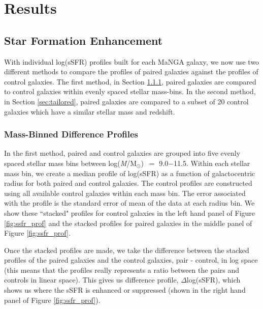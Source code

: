 \documentclass[iop,revtex4,twocolumn,apj,numberedappendix,appendixfloats]{emulateapj}
\newcommand{\logm}{log({\it M}/M$_{\odot}$)}
\begin{document}
\section{Results}\label{sec:results}

\subsection{Star Formation Enhancement}

With individual log(sSFR) profiles built for each MaNGA galaxy, we now use two different methods to compare the profiles of paired galaxies against the profiles of control galaxies. The first method, in Section \ref{sec:mass-bin}, paired galaxies are compared to control galaxies within evenly spaced stellar mass-bins. In the second method, in Section \ref{sec:tailored}, paired galaxies are compared to a subset of 20 control galaxies which have a similar stellar mass and redshift. 

\subsubsection{Mass-Binned Difference Profiles}\label{sec:mass-bin}

In the first method, paired and control galaxies are grouped into five evenly spaced stellar mass bins between \logm\ $=$ 9.0$-$11.5. Within each stellar mass bin, we create a median profile of log(sSFR) as a function of galactocentric radius for both paired and control galaxies. The control profiles are constructed using all available control galaxies within each mass bin. The error associated with the profile is the standard error of mean of the data at each radius bin. We show these ``stacked" profiles for control galaxies in the left hand panel of Figure \ref{fig:ssfr_prof} and the stacked profiles for paired galaxies in the middle panel of Figure \ref{fig:ssfr_prof}.

Once the stacked profiles are made, we take the difference between the stacked profiles of the paired galaxies and the control galaxies, pair - control, in log space (this means that the profiles really represents a ratio between the pairs and controls in linear space). This gives us difference profile, $\Delta$log(sSFR), which shows us where the sSFR is enhanced or suppressed (shown in the right hand panel of Figure \ref{fig:ssfr_prof}). 
\end{document}
